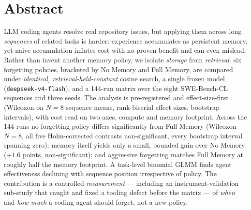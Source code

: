 

\chapter*{Abstract}

LLM coding agents resolve real repository issues, but applying them across long
\emph{sequences} of related tasks is harder: experience accumulates as persistent memory, yet
naive accumulation inflates cost with no proven benefit and can even mislead. Rather than
invent another memory policy, we isolate \emph{storage} from \emph{retrieval}: six forgetting
policies, bracketed by No Memory and Full Memory, are compared under \emph{identical,
retrieval-held-constant} cosine search, a single frozen model (\texttt{deepseek-v4-flash}),
and a 144-run matrix over the eight SWE-Bench-CL sequences and three seeds. The analysis is
pre-registered and effect-size-first (Wilcoxon on $N=8$ sequence means, rank-biserial effect
sizes, bootstrap intervals), with cost read on two axes, compute and memory footprint. Across
the 144 runs no forgetting policy differs significantly from Full Memory (Wilcoxon $N=8$, all
five Holm-corrected contrasts non-significant, every bootstrap interval spanning zero); memory
itself yields only a small, bounded gain over No Memory ($+1.6$ points, non-significant); and
aggressive forgetting matches Full Memory at roughly half the memory footprint. A task-level
binomial GLMM finds agent effectiveness declining with sequence position irrespective of policy.
The contribution is a controlled
\emph{measurement} --- including an instrument-validation sub-study that caught and fixed a
tooling defect before the matrix --- of \emph{when} and \emph{how much} a coding agent should
forget, not a new policy.
